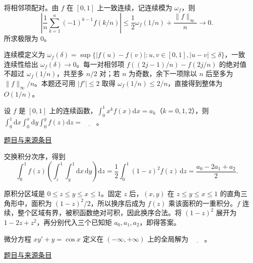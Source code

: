 \documentclass[UTF8,12pt,a4paper,fontset=fandol]{ctexart}
\begin{document}
\begin{solve}\label{ans:fin15-high:2}

将相邻项配对。由 $f$ 在 $[0,1]$ 上一致连续，记连续模为 $\omega_f$，则
\[
\left|\frac1n\sum_{k=1}^n(-1)^{k-1}f(k/n)\right|
\le\frac12\omega_f(1/n)+\frac{\|f\|_\infty}{n}\longrightarrow0.
\]
所求极限为 $\boxed0$。

连续模定义为 $\omega_f(\delta)=\sup\{|f(u)-f(v)|:u,v\in[0,1],|u-v|\le\delta\}$，一致连续性给出 $\omega_f(\delta)\to0$。每一对相邻项 $f((2j-1)/n)-f(2j/n)$ 的绝对值不超过 $\omega_f(1/n)$，共至多 $n/2$ 对；若 $n$ 为奇数，余下一项除以 $n$ 后至多为 $\|f\|_\infty/n$。本题还可用 $|f'|\le2$ 取得 $\omega_f(1/n)\le2/n$，直接得到整体为 $O(1/n)$。

\end{solve}

\begin{example}[来源序号3]\label{ex:fin15-high:3}\label{pr:fin15-high:3}

设 $f$ 是 $[0,1]$ 上的连续函数，$\int_{0}^{1}x^{k}f(x)\mathrm{d}x = a_{k}$（$k = 0,1,2$），则 $\int_{0}^{1}\mathrm{d}x\int_{0}^{x}\mathrm{d}y\int_{0}^{y}f(z)\mathrm{d}z = \underline{\qquad}$。

\par\href{https://github.com/lzxcr/cmc-mathematics/blob/64916fa1fdbc3e444a652eca204d5669058ee321/src/problems/finals/15/03.md}{题目与来源条目}

\end{example}

\begin{solve}\label{ans:fin15-high:3}

交换积分次序，得到
\[
\int_0^1f(z)\left(\int_z^1\int_y^1\mathrm dx\,\mathrm dy\right)\mathrm dz
=\frac12\int_0^1(1-z)^2f(z)\,\mathrm dz
=\boxed{\frac{a_0-2a_1+a_2}{2}}.
\]

原积分区域是 $0\le z\le y\le x\le1$。固定 $z$ 后，$(x,y)$ 在 $z\le y\le x\le1$ 的直角三角形中，面积为 $(1-z)^2/2$，所以换序后成为 $f(z)$ 乘该面积的一重积分。$f$ 连续，整个区域有界，被积函数绝对可积，因此换序合法。将 $(1-z)^2$ 展开为 $1-2z+z^2$，再分别代入三个已知矩 $a_0,a_1,a_2$，即得答案。

\end{solve}

\begin{example}[来源序号4]\label{ex:fin15-high:4}\label{pr:fin15-high:4}

微分方程 $xy' + y = \cos x$ 定义在 $(-\infty,+\infty)$ 上的全局解为 $\underline{\qquad}$。

\par\href{https://github.com/lzxcr/cmc-mathematics/blob/64916fa1fdbc3e444a652eca204d5669058ee321/src/problems/finals/15/04.md}{题目与来源条目}

\end{example}
\end{document}
